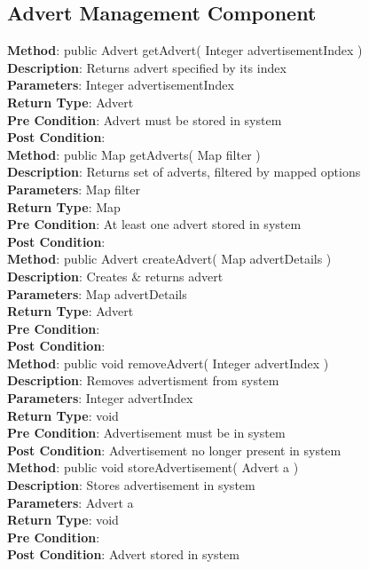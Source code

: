 \documentclass{l3deliverable}
\begin{document}
\subsection{Advert Management Component}
\textbf{Method}: public Advert getAdvert( Integer advertisementIndex )\\
\textbf{Description}: Returns advert specified by its index\\
\textbf{Parameters}: Integer advertisementIndex\\
\textbf{Return Type}: Advert\\
\textbf{Pre Condition}: Advert must be stored in system\\
\textbf{Post Condition}:\\

\textbf{Method}: public Map getAdverts( Map filter )\\
\textbf{Description}: Returns set of adverts, filtered by mapped options\\
\textbf{Parameters}: Map filter\\
\textbf{Return Type}: Map\\
\textbf{Pre Condition}: At least one advert stored in system\\
\textbf{Post Condition}:\\

\textbf{Method}: public Advert createAdvert( Map advertDetails )\\
\textbf{Description}: Creates \& returns advert\\
\textbf{Parameters}: Map advertDetails\\
\textbf{Return Type}: Advert \\
\textbf{Pre Condition}:\\
\textbf{Post Condition}:\\

\textbf{Method}: public void removeAdvert( Integer advertIndex )\\
\textbf{Description}: Removes advertisment from system\\
\textbf{Parameters}: Integer advertIndex \\
\textbf{Return Type}: void \\
\textbf{Pre Condition}: Advertisement must be in system \\
\textbf{Post Condition}: Advertisement no longer present in system\\

\textbf{Method}: public void storeAdvertisement( Advert a )\\
\textbf{Description}: Stores advertisement in system\\
\textbf{Parameters}: Advert a\\
\textbf{Return Type}: void\\
\textbf{Pre Condition}:\\
\textbf{Post Condition}: Advert stored in system\\
\end{document}

